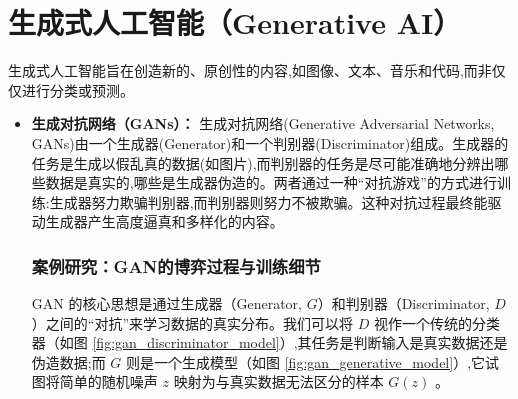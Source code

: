 \section{生成式人工智能（Generative AI）}
\label{sec:generative_ai}
生成式人工智能旨在创造新的、原创性的内容,如图像、文本、音乐和代码,而非仅仅进行分类或预测。
\begin{itemize}
    \item \textbf{生成对抗网络（GANs）：} 生成对抗网络(Generative Adversarial Networks, GANs)由一个生成器(Generator)和一个判别器(Discriminator)组成。生成器的任务是生成以假乱真的数据(如图片),而判别器的任务是尽可能准确地分辨出哪些数据是真实的,哪些是生成器伪造的。两者通过一种“对抗游戏”的方式进行训练:生成器努力欺骗判别器,而判别器则努力不被欺骗。这种对抗过程最终能驱动生成器产生高度逼真和多样化的内容。
    
    \subsubsection*{案例研究：GAN的博弈过程与训练细节}
    \label{sssec:gan_case_study}
    GAN 的核心思想是通过生成器（Generator, $G$）和判别器（Discriminator, $D$）之间的“对抗”来学习数据的真实分布。我们可以将 $D$ 视作一个传统的分类器（如图 \ref{fig:gan_discriminator_model}）,其任务是判断输入是真实数据还是伪造数据;而 $G$ 则是一个生成模型（如图 \ref{fig:gan_generative_model}）,它试图将简单的随机噪声 $z$ 映射为与真实数据无法区分的样本 $G(z)$ \cite{15}。


\end{itemize}
